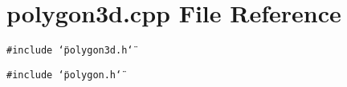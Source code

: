 \section{polygon3d.cpp File Reference}
\label{polygon3d_8cpp}
{\tt \#include \char`\"{}polygon3d.h\char`\"{}}\par
{\tt \#include \char`\"{}polygon.h\char`\"{}}\par
